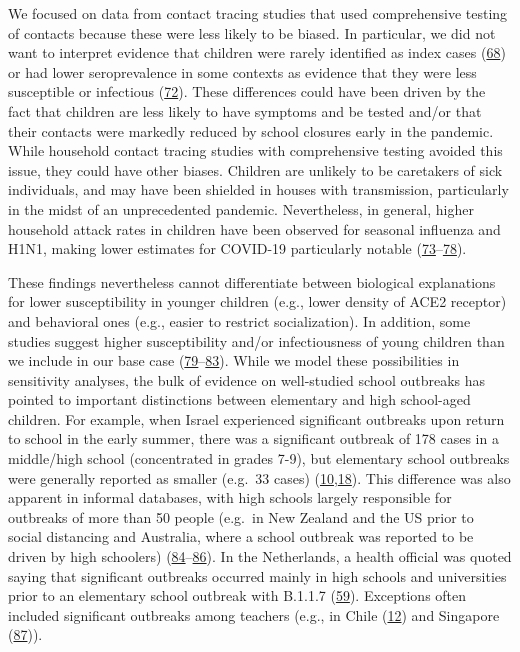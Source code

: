 \documentclass[
]{article}
\begin{document}
We focused on data from contact tracing studies that used comprehensive
testing of contacts because these were less likely to be biased. In
particular, we did not want to interpret evidence that children were
rarely identified as index cases
(\protect\hyperlink{ref-zhu_meta-analysis_2020}{68}) or had lower
seroprevalence in some contexts as evidence that they were less
susceptible or infectious
(\protect\hyperlink{ref-goldstein_effect_2020}{72}). These differences
could have been driven by the fact that children are less likely to have
symptoms and be tested and/or that their contacts were markedly reduced
by school closures early in the pandemic. While household contact
tracing studies with comprehensive testing avoided this issue, they
could have other biases. Children are unlikely to be caretakers of sick
individuals, and may have been shielded in houses with transmission,
particularly in the midst of an unprecedented pandemic. Nevertheless, in
general, higher household attack rates in children have been observed
for seasonal influenza and H1N1, making lower estimates for COVID-19
particularly notable
(\protect\hyperlink{ref-carcione_secondary_2011}{73}--\protect\hyperlink{ref-wu_infection_2010}{78}).

These findings nevertheless cannot differentiate between biological
explanations for lower susceptibility in younger children (e.g., lower
density of ACE2 receptor) and behavioral ones (e.g., easier to restrict
socialization). In addition, some studies suggest higher susceptibility
and/or infectiousness of young children than we include in our base case
(\protect\hyperlink{ref-bi_epidemiology_2020}{79}--\protect\hyperlink{ref-lopez_bernal_transmission_2020}{83}).
While we model these possibilities in sensitivity analyses, the bulk of
evidence on well-studied school outbreaks has pointed to important
distinctions between elementary and high school-aged children. For
example, when Israel experienced significant outbreaks upon return to
school in the early summer, there was a significant outbreak of 178
cases in a middle/high school (concentrated in grades 7-9), but
elementary school outbreaks were generally reported as smaller (e.g.~33
cases)
(\protect\hyperlink{ref-stein-zamir_large_2020}{10},\protect\hyperlink{ref-vogel_as_2020}{18}).
This difference was also apparent in informal databases, with high
schools largely responsible for outbreaks of more than 50 people
(e.g.~in New Zealand and the US prior to social distancing and
Australia, where a school outbreak was reported to be driven by high
schoolers)
(\protect\hyperlink{ref-leclerc_what_2020}{84}--\protect\hyperlink{ref-noauthor_national_nodate}{86}).
In the Netherlands, a health official was quoted saying that significant
outbreaks occurred mainly in high schools and universities prior to an
elementary school outbreak with B.1.1.7
(\protect\hyperlink{ref-vogeljan_15_school_2021}{59}). Exceptions often
included significant outbreaks among teachers (e.g., in Chile
(\protect\hyperlink{ref-torres_sars-cov-2_nodate}{12}) and Singapore
(\protect\hyperlink{ref-noauthor_covid-19_nodate-1}{87})).
\end{document}
